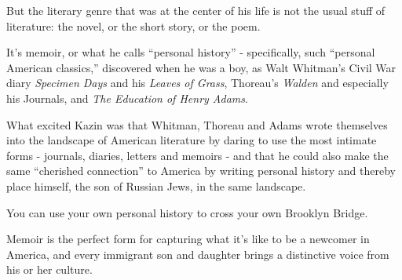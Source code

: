 \documentclass{book}
\numberwithin{equation}{section}
\begin{document}
But the literary genre that was at the center of his life is not the usual stuff of literature: the novel, or the short story, or the poem.

It's memoir, or what he calls ``personal history'' - specifically, such ``personal American classics,'' discovered when he was a boy, as Walt Whitman's Civil War diary \textit{Specimen Days} and his \textit{Leaves of Grass}, Thoreau's \textit{Walden} and especially his Journals, and \textit{The Education of Henry Adams}.

What excited Kazin was that Whitman, Thoreau and Adams wrote themselves into the landscape of American literature by daring to use the most intimate forms - journals, diaries, letters and memoirs - and that he could also make the same ``cherished connection'' to America by writing personal history and thereby place himself, the son of Russian Jews, in the same landscape.

%
You can use your own personal history to cross your own Brooklyn Bridge.

Memoir is the perfect form for capturing what it's like to be a newcomer in America, and every immigrant son and daughter brings a distinctive voice from his or her culture.
\end{document}
